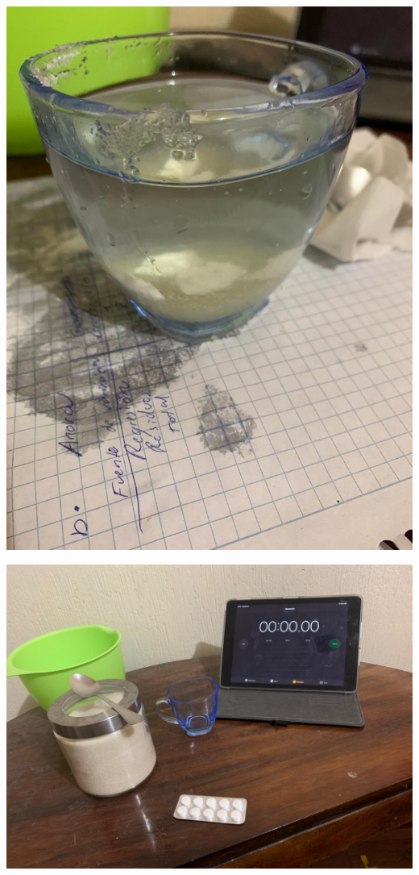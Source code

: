 \documentclass[a4paper,12pt]{article}
\begin{document}
\begin{center}
    \includegraphics[scale=0.2]{Imagenes/4.JPG}
\end{center}
\begin{center}
    \includegraphics[scale=0.2]{Imagenes/5.JPG}
\end{center}
\end{document}
